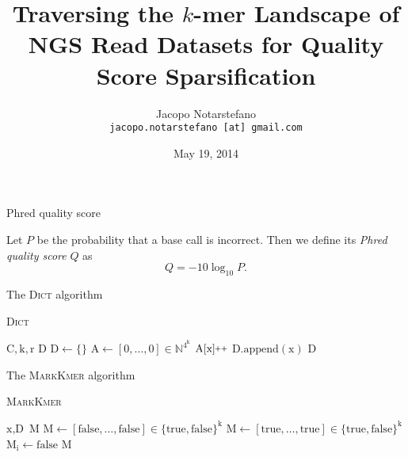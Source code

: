 \documentclass[12pt]{beamer}
\title{Traversing the \(k\)-mer Landscape of NGS Read Datasets for Quality Score Sparsification}
\author[Jacopo Notarstefano]{
    Jacopo Notarstefano\\
    \texttt{jacopo.notarstefano [at] gmail.com}
}
\date{May 19, 2014}
\newcommand{\pp}{\nolinebreak\hspace{-.05em}\raisebox{.4ex}{\tiny\bf +}\nolinebreak\raisebox{.4ex}{\tiny\bf +}}
\begin{document}
    \begin{frame}[plain]
        \titlepage
    \end{frame}

    \begin{frame}{}
    \end{frame}

    \begin{frame}{Phred quality score}
        \begin{definition}
            Let \(P\) be the probability that a base call is incorrect. Then we
	    define its \emph{Phred quality score} \(Q\) as
            \[
                Q = -10\log_{10}{P}\text{.}
	    \]
        \end{definition}
    \end{frame}

    \begin{frame}{The \textsc{Dict} algorithm}
        \begin{algorithm}[H]
	    \caption{\textsc{Dict}}
	    \begin{algorithmic}[1]
                \REQUIRE \(\text{C}, \text{k}, \text{r}\)
		\ENSURE \(\text{D}\)
		\STATE \(\text{D} \leftarrow \{\}\)
		\STATE \(\text{A} \leftarrow [0,\dots,0] \in \mathbb{N}^{4^\text{k}}\)
		    \STATE \(\text{A}[\text{x}]\pp\)
		\ENDFOR
		        \STATE \(\text{D}.\text{append}(\text{x})\)
		    \ENDIF
		\ENDFOR
		\RETURN \(\text{D}\)
	    \end{algorithmic}
	\end{algorithm}
    \end{frame}

    \begin{frame}{The \textsc{MarkKmer} algorithm}
        \begin{algorithm}[H]
	    \caption{\textsc{MarkKmer}}
	    \begin{algorithmic}[1]
		\REQUIRE \(\text{x}, \text{D}\)
		\ENSURE \(\text{M}\)
		    \STATE \(\text{M} \leftarrow [\text{false},\dots,\text{false}]\in\{\text{true},\text{false}\}^\text{k}\)
		\ELSE
		    \STATE \(\text{M} \leftarrow [\text{true},\dots,\text{true}]\in\{\text{true},\text{false}\}^\text{k}\)
			        \STATE \(\text{M}_\text{i}\leftarrow\text{false}\)
			    \ENDIF
			\ENDFOR
		    \ENDFOR
		\ENDIF
		\RETURN \(\text{M}\)
	    \end{algorithmic}
	\end{algorithm}
    \end{frame}
\end{document}
